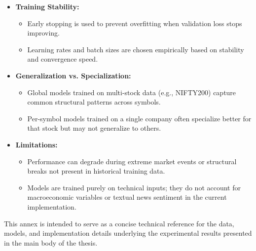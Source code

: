 \begin{itemize}
    \item \textbf{Training Stability:}
    \begin{itemize}
        \item Early stopping is used to prevent overfitting when validation loss stops improving.
        \item Learning rates and batch sizes are chosen empirically based on stability and convergence speed.
    \end{itemize}

    \item \textbf{Generalization vs. Specialization:}
    \begin{itemize}
        \item Global models trained on multi-stock data (e.g., NIFTY200) capture common structural patterns across symbols.
        \item Per-symbol models trained on a single company often specialize better for that stock but may not generalize to others.
    \end{itemize}

    \item \textbf{Limitations:}
    \begin{itemize}
        \item Performance can degrade during extreme market events or structural breaks not present in historical training data.
        \item Models are trained purely on technical inputs; they do not account for macroeconomic variables or textual news sentiment in the current implementation.
    \end{itemize}
\end{itemize}

\vspace{1em}

This annex is intended to serve as a concise technical reference for the data, models, and implementation details underlying the experimental results presented in the main body of the thesis.
